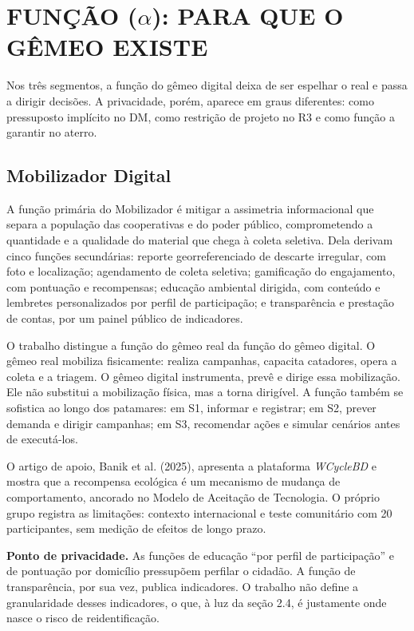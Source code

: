 \documentclass[12pt,a4paper,article,oneside,english,brazil]{abntex2}
\begin{document}
\section{FUNÇÃO (\texorpdfstring{$\alpha$}{alfa}): PARA QUE O GÊMEO EXISTE}

Nos três segmentos, a função do gêmeo digital deixa de ser espelhar o real e passa a dirigir decisões. A privacidade, porém, aparece em graus diferentes: como pressuposto implícito no DM, como restrição de projeto no R3 e como função a garantir no aterro.

\subsection{Mobilizador Digital}

A função primária do Mobilizador é mitigar a assimetria informacional que separa a população das cooperativas e do poder público, comprometendo a quantidade e a qualidade do material que chega à coleta seletiva. Dela derivam cinco funções secundárias: reporte georreferenciado de descarte irregular, com foto e localização; agendamento de coleta seletiva; gamificação do engajamento, com pontuação e recompensas; educação ambiental dirigida, com conteúdo e lembretes personalizados por perfil de participação; e transparência e prestação de contas, por um painel público de indicadores.

O trabalho distingue a função do gêmeo real da função do gêmeo digital. O gêmeo real mobiliza fisicamente: realiza campanhas, capacita catadores, opera a coleta e a triagem. O gêmeo digital instrumenta, prevê e dirige essa mobilização. Ele não substitui a mobilização física, mas a torna dirigível. A função também se sofistica ao longo dos patamares: em S1, informar e registrar; em S2, prever demanda e dirigir campanhas; em S3, recomendar ações e simular cenários antes de executá-los.

O artigo de apoio, Banik et al. (2025), apresenta a plataforma \textit{WCycleBD} e mostra que a recompensa ecológica é um mecanismo de mudança de comportamento, ancorado no Modelo de Aceitação de Tecnologia. O próprio grupo registra as limitações: contexto internacional e teste comunitário com 20 participantes, sem medição de efeitos de longo prazo.

\textbf{Ponto de privacidade.} As funções de educação ``por perfil de participação'' e de pontuação por domicílio pressupõem perfilar o cidadão. A função de transparência, por sua vez, publica indicadores. O trabalho não define a granularidade desses indicadores, o que, à luz da seção 2.4, é justamente onde nasce o risco de reidentificação.
\end{document}
